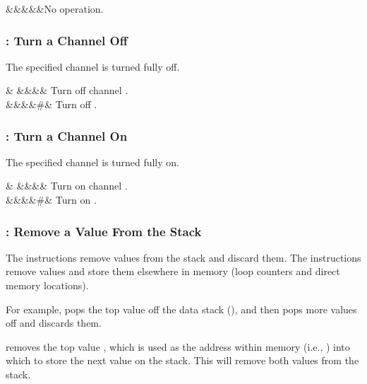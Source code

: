 \documentclass[letterpaper,twoside,onecolumn,openright,final]{memoir}
\begin{document}
{\begin{opdesc}
  &&&&&No operation.\\
\end{opdesc}

\subsubsection{: Turn a Channel Off}
The specified channel is turned fully off.

\begin{opdesc}
   &           &&&\z{\$}& Turn off channel .\\
   &&&&\z\#& Turn off .\\
\end{opdesc}

\subsubsection{: Turn a Channel On}
The specified channel is turned fully on.

\begin{opdesc}
   &           &&&\z{\$}& Turn on channel .\\
   &&&&\z\#& Turn on .\\
\end{opdesc}

\subsubsection{: Remove a Value From the Stack}
The  instructions remove values from the stack and discard them. 
The  instructions remove values and store them elsewhere in memory
(loop counters and direct memory locations).

For example,  pops the top value off the data stack (),
and then pops  more values off and discards them.

 removes the top value , which is used as the address
within memory (i.e., \z{[}\z{]}) into which to store the next value
 on the stack.  This will remove both values from the stack.

}
\end{document}
